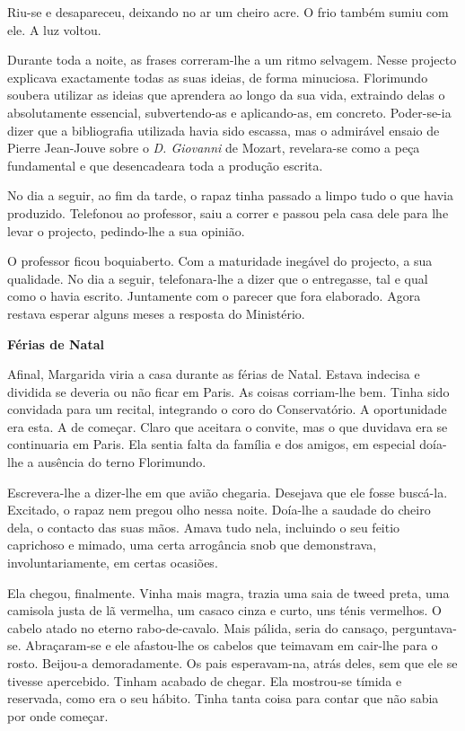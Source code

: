 Riu-se e desapareceu, deixando no ar um cheiro acre. O frio também sumiu
com ele. A luz voltou.

Durante toda a noite, as frases correram-lhe a um ritmo selvagem. Nesse
projecto explicava exactamente todas as suas ideias, de forma minuciosa.
Florimundo soubera utilizar as ideias que aprendera ao longo da sua
vida, extraindo delas o absolutamente essencial, subvertendo-as e
aplicando-as, em concreto. Poder-se-ia dizer que a bibliografia
utilizada havia sido escassa, mas o admirável ensaio de Pierre
Jean-Jouve sobre o \emph{D. Giovanni} de Mozart, revelara-se como a peça
fundamental e que desencadeara toda a produção escrita.

No dia a seguir, ao fim da tarde, o rapaz tinha passado a limpo tudo o
que havia produzido. Telefonou ao professor, saiu a correr e passou pela
casa dele para lhe levar o projecto, pedindo-lhe a sua opinião.

O professor ficou boquiaberto. Com a maturidade inegável do projecto, a
sua qualidade. No dia a seguir, telefonara-lhe a dizer que o entregasse,
tal e qual como o havia escrito. Juntamente com o parecer que fora
elaborado. Agora restava esperar alguns meses a resposta do Ministério.

\vspace*{1.8cm}
\noindent{}\textbf{Férias de Natal}

\bigskip

Afinal, Margarida viria a casa durante as férias de Natal. Estava
indecisa e dividida se deveria ou não ficar em Paris. As coisas
corriam-lhe bem. Tinha sido convidada para um recital, integrando o coro
do Conservatório. A oportunidade era esta. A de começar. Claro que
aceitara o convite, mas o que duvidava era se continuaria em Paris. Ela
sentia falta da família e dos amigos, em especial doía-lhe a ausência do
terno Florimundo.

Escrevera-lhe a dizer-lhe em que avião chegaria. Desejava que ele fosse
buscá-la. Excitado, o rapaz nem pregou olho nessa noite. Doía-lhe a
saudade do cheiro dela, o contacto das suas mãos. Amava tudo nela,
incluindo o seu feitio caprichoso e mimado, uma certa arrogância snob
que demonstrava, involuntariamente, em certas ocasiões.

Ela chegou, finalmente. Vinha mais magra, trazia uma saia de tweed
preta, uma camisola justa de lã vermelha, um casaco cinza e curto, uns
ténis vermelhos. O cabelo atado no eterno rabo-de-cavalo. Mais pálida,
seria do cansaço, perguntava-se. Abraçaram-se e ele afastou-lhe os
cabelos que teimavam em cair-lhe para o rosto. Beijou-a demoradamente.
Os pais esperavam-na, atrás deles, sem que ele se tivesse apercebido.
Tinham acabado de chegar. Ela mostrou-se tímida e reservada, como era o
seu hábito. Tinha tanta coisa para contar que não sabia por onde
começar.

